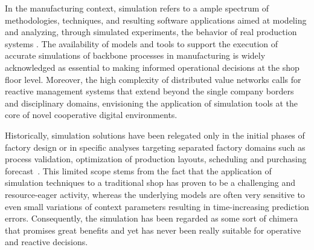 In the manufacturing context, simulation refers to a ample spectrum of methodologies, techniques, and resulting software applications aimed at modeling and analyzing, through simulated experiments, the behavior of real production systems \cite{chung2003simulation, bangsow2010manufacturing}. 
The availability of models and tools to support the execution of accurate simulations of backbone processes in manufacturing is widely acknowledged as essential to making informed operational decisions at the shop floor level. 
Moreover, the high complexity of distributed value networks calls for reactive management systems that extend beyond the single company borders and disciplinary domains, envisioning the application of simulation tools at the core of novel cooperative digital environments. 

Historically, simulation solutions have been relegated only in the initial phases of factory design or in specific analyses targeting separated factory domains such as process validation, optimization of production layouts, scheduling and purchasing forecast~\cite{fowler2004grand}.
This limited scope stems from the fact that the application of simulation techniques to a traditional shop has proven to be a challenging and resource-eager activity, whereas the underlying models are often very sensitive to even small variations of context parameters resulting in time-increasing prediction errors. 
Consequently, the simulation has been regarded as some sort of chimera that promises great benefits and yet has never been really suitable for operative and reactive decisions. 

